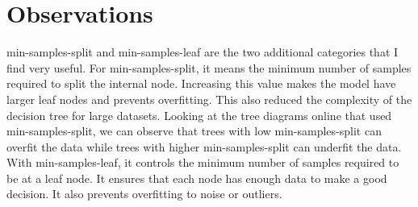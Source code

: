 \documentclass[a4paper]{article}
\begin{document}
\section*{Observations}
min-samples-split and min-samples-leaf are the two additional categories that I find very useful. For min-samples-split, it means the minimum number of samples required to split the internal node. Increasing this value makes the model have larger leaf nodes and prevents overfitting. This also reduced the complexity of the decision tree for large datasets. Looking at the tree diagrams online that used min-samples-split, we can observe that trees with low min-samples-split can overfit the data while trees with higher min-samples-split can underfit the data. With min-samples-leaf, it controls the minimum number of samples required to be at a leaf node. It ensures that each node has enough data to make a good decision. It also prevents overfitting to noise or outliers.
\end{document}
